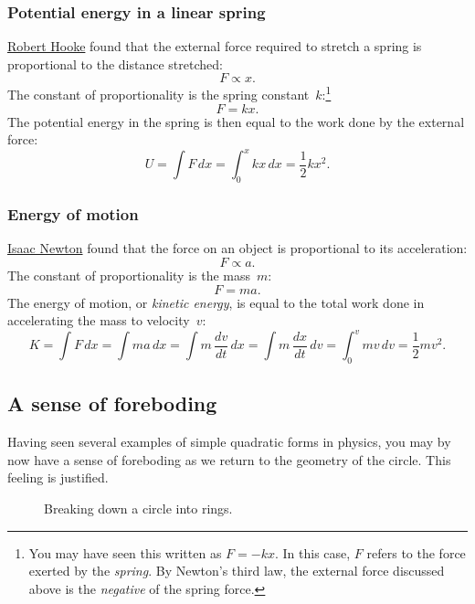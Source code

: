     \subsubsection{Potential energy in a linear spring} %
    \label{sec:potential_energy_in_a_linear_spring}

\href{http://en.wikipedia.org/wiki/Robert_Hooke}{Robert Hooke} found that the external force required to stretch a spring is proportional to the distance stretched:
\[ F \propto x. \]
The constant of proportionality is the spring constant~$k$:\footnote{You may have seen this written as $F = -kx$. In this case, $F$ refers to the force exerted by the \emph{spring}. By Newton's third law, the external force discussed above is the \emph{negative} of the spring force.}
\[ F = k x. \]
The potential energy in the spring is then equal to the work done by the external force:
\[ U = \int F\,dx = \int_0^x kx\,dx = \textstyle{\frac{1}{2}} kx^2. \]

    \subsubsection{Energy of motion} %
    \label{sec:energy_of_motion}

\href{http://en.wikipedia.org/wiki/Isaac_Newton}{Isaac Newton} found that the force on an object is proportional to its acceleration:
\[ F \propto a. \]
The constant of proportionality is the mass~$m$:
\[ F = m a. \]
The energy of motion, or \emph{kinetic energy}, is equal to the total work done in accelerating the mass to velocity~$v$:
\[ K = \int F\,dx = \int ma\,dx = \int m\,\frac{dv}{dt}\,dx = \int m\, \frac{dx}{dt}\,dv = \int_0^v mv\,dv = \textstyle{\frac{1}{2}} mv^2. \]

  \subsection{A sense of foreboding} %
  \label{sec:a_sense_of_foreboding}

Having seen several examples of simple quadratic forms in physics, you may by now have a sense of foreboding as we return to the geometry of the circle. This feeling is justified.

\begin{figure}
\begin{center}
\end{center}
\caption{Breaking down a circle into rings.\label{fig:circular_area}}
\end{figure}


